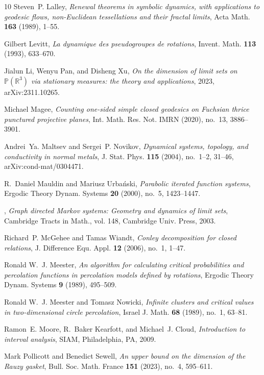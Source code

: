 \documentclass[11pt]{amsart}
\theoremstyle{definition}
\theoremstyle{remark}
\begin{document}
\begin{thebibliography}{10}
Steven~P. Lalley, \emph{Renewal theorems in symbolic dynamics, with
  applications to geodesic flows, non-{E}uclidean tessellations and their
  fractal limits}, Acta Math. \textbf{163} (1989), 1--55.

Gilbert Levitt, \emph{La dynamique des pseudogroupes de rotations}, Invent.
  Math. \textbf{113} (1993), 633--670.

Jialun Li, Wenyu Pan, and Disheng Xu, \emph{On the dimension of limit sets on
  $\mathbb{P}(\mathbb{R}^3)$ via stationary measures: the theory and
  applications}, 2023, arXiv:2311.10265.

Michael Magee, \emph{Counting one-sided simple closed geodesics on {F}uchsian
  thrice punctured projective planes}, Int. Math. Res. Not. IMRN (2020),
  no.~13, 3886--3901.

Andrei~Ya. Maltsev and Sergei~P. Novikov, \emph{Dynamical systems, topology,
  and conductivity in normal metals}, J. Stat. Phys. \textbf{115} (2004),
  no.~1--2, 31--46, arXiv:cond-mat/0304471.

R.~Daniel Mauldin and Mariusz Urba{\'n}ski, \emph{Parabolic iterated function
  systems}, Ergodic Theory Dynam. Systems \textbf{20} (2000), no.~5,
  1423--1447.

\bysame, \emph{Graph directed {M}arkov systems: Geometry and dynamics of limit
  sets}, Cambridge Tracts in Math., vol. 148, Cambridge Univ. Press, 2003.

Richard~P. McGehee and Tamas Wiandt, \emph{Conley decomposition for closed
  relations}, J. Difference Equ. Appl. \textbf{12} (2006), no.~1, 1--47.

Ronald W.~J. Meester, \emph{An algorithm for calculating critical probabilities
  and percolation functions in percolation models defined by rotations},
  Ergodic Theory Dynam. Systems \textbf{9} (1989), 495--509.

Ronald W.~J. Meester and Tomasz Nowicki, \emph{Infinite clusters and critical
  values in two-dimensional circle percolation}, Israel J. Math. \textbf{68}
  (1989), no.~1, 63--81.

Ramon~E. Moore, R.~Baker Kearfott, and Michael~J. Cloud, \emph{Introduction to
  interval analysis}, SIAM, Philadelphia, PA, 2009.

Mark Pollicott and Benedict Sewell, \emph{An upper bound on the dimension of
  the {R}auzy gasket}, Bull. Soc. Math. France \textbf{151} (2023), no.~4,
  595--611.


\end{thebibliography}
\end{document}

